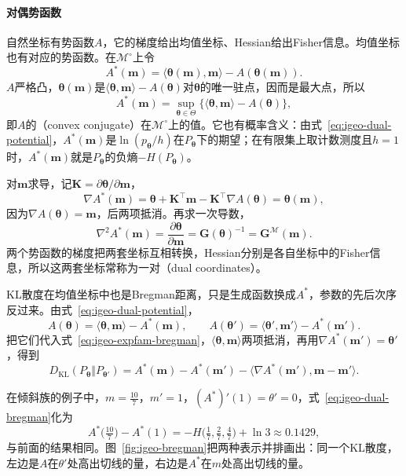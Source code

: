 \paragraph{对偶势函数}
自然坐标有势函数$A$，它的梯度给出均值坐标、Hessian给出Fisher信息。均值坐标也有对应的势函数。在$\mathcal{M}^{\circ}$上令
\begin{equation}
  A^{*}(\bm{m})=\langle\bm{\theta}(\bm{m}),\bm{m}\rangle-A(\bm{\theta}(\bm{m})).
  \label{eq:igeo-dual-potential}
\end{equation}
$A$严格凸，$\bm{\theta}(\bm{m})$是$\langle\bm{\theta},\bm{m}\rangle-A(\bm{\theta})$对$\bm{\theta}$的唯一驻点，因而是最大点，所以
\[
  A^{*}(\bm{m})=\sup_{\bm{\theta}\in\Theta}\bigl\{\langle\bm{\theta},\bm{m}\rangle-A(\bm{\theta})\bigr\},
\]
即$A$的（convex conjugate）在$\mathcal{M}^{\circ}$上的值。它也有概率含义：由式~\eqref{eq:igeo-dual-potential}，$A^{*}(\bm{m})$是$\ln(p_{\bm{\theta}}/h)$在$P_{\bm{\theta}}$下的期望；在有限集上取计数测度且$h=1$时，$A^{*}(\bm{m})$就是$P_{\bm{\theta}}$的负熵$-H(P_{\bm{\theta}})$。

对$\bm{m}$求导，记$\bm{K}=\partial\bm{\theta}/\partial\bm{m}$，
\[
  \nabla A^{*}(\bm{m})=\bm{\theta}+\bm{K}^{\top}\bm{m}-\bm{K}^{\top}\nabla A(\bm{\theta})=\bm{\theta}(\bm{m}),
\]
因为$\nabla A(\bm{\theta})=\bm{m}$，后两项抵消。再求一次导数，
\[
  \nabla^{2}A^{*}(\bm{m})=\frac{\partial\bm{\theta}}{\partial\bm{m}}=\bm{G}(\bm{\theta})^{-1}=\bm{G}^{\mathcal{M}}(\bm{m}).
\]
两个势函数的梯度把两套坐标互相转换，Hessian分别是各自坐标中的Fisher信息，所以这两套坐标常称为一对（dual coordinates）。

KL散度在均值坐标中也是Bregman距离，只是生成函数换成$A^{*}$，参数的先后次序反过来。由式~\eqref{eq:igeo-dual-potential}，
\[
  A(\bm{\theta})=\langle\bm{\theta},\bm{m}\rangle-A^{*}(\bm{m}),\qquad A(\bm{\theta}')=\langle\bm{\theta}',\bm{m}'\rangle-A^{*}(\bm{m}').
\]
把它们代入式~\eqref{eq:igeo-expfam-bregman}，$\langle\bm{\theta},\bm{m}\rangle$两项抵消，再用$\nabla A^{*}(\bm{m}')=\bm{\theta}'$，得到
\begin{equation}
  D_{\mathrm{KL}}(P_{\bm{\theta}}\Vert P_{\bm{\theta}'})=A^{*}(\bm{m})-A^{*}(\bm{m}')-\langle\nabla A^{*}(\bm{m}'),\bm{m}-\bm{m}'\rangle .
  \label{eq:igeo-dual-bregman}
\end{equation}

在倾斜族的例子中，$m=\frac{10}{7}$，$m'=1$，$(A^{*})'(1)=\theta'=0$，式~\eqref{eq:igeo-dual-bregman}化为
\[
  A^{*}\bigl(\tfrac{10}{7}\bigr)-A^{*}(1)=-H\bigl(\tfrac17,\tfrac27,\tfrac47\bigr)+\ln3\approx0.1429,
\]
与前面的结果相同。图~\ref{fig:igeo-bregman}把两种表示并排画出：同一个KL散度，左边是$A$在$\theta'$处高出切线的量，右边是$A^{*}$在$m$处高出切线的量。

